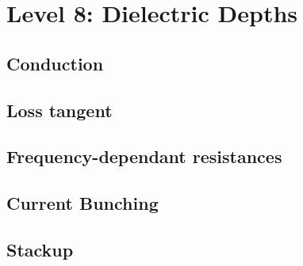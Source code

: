 

\section{Level 8: Dielectric Depths}
\subsection{Conduction}
\subsection{Loss tangent}
\subsection{Frequency-dependant resistances}
\subsection{Current Bunching}
\subsection{Stackup}

